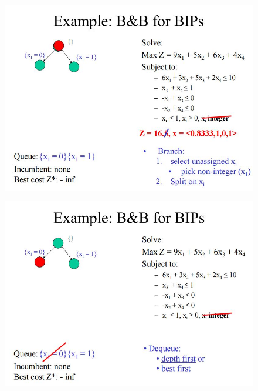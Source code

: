 \documentclass{beamer}
\begin{document}
\begin{frame}
	\begin{figure}
		\centering
		\includegraphics[width=1.1\linewidth]{BB-BIP/BB-BIP5}
	\end{figure}
\end{frame}
\begin{frame}
	\begin{figure}
		\centering
		\includegraphics[width=1.0\linewidth]{BB-BIP/BB-BIP6}
	\end{figure}
\end{frame}
\end{document}
